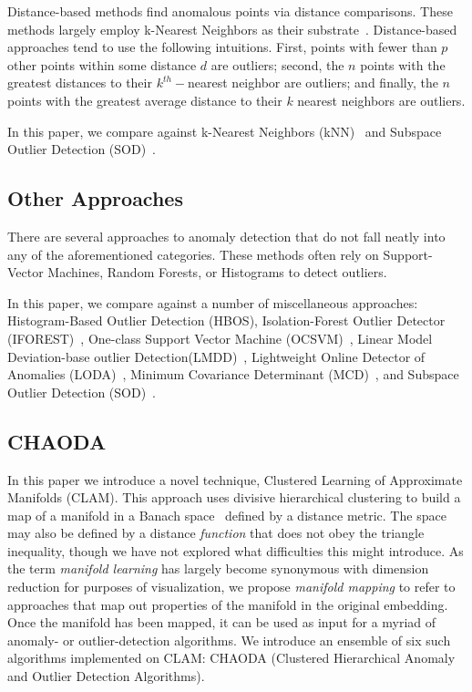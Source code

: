 Distance-based methods find anomalous points via distance comparisons.
These methods largely employ k-Nearest Neighbors as their substrate~\cite{wang2019progress}.
Distance-based approaches tend to use the following intuitions. First, points with fewer than $p$ other points within some distance $d$ are outliers; second, the $n$ points with the greatest distances to their $k^{th}-$nearest neighbor are outliers;
and finally, the $n$ points with the greatest average distance to their $k$ nearest neighbors are outliers.

In this paper, we compare against
k-Nearest Neighbors (kNN)~\cite{ramaswamy2000efficient, sridhar2000knn, fabrizio2002knn}
and Subspace Outlier Detection (SOD)~\cite{kriegel2009sod}.


\subsection{Other Approaches}
\label{subsec:introduction:other-appraoches}

There are several approaches to anomaly detection that do not fall neatly into any of the aforementioned categories.
These methods often rely on Support-Vector Machines, Random Forests, or Histograms to detect outliers.

In this paper, we compare against a number of miscellaneous approaches:
Histogram-Based Outlier Detection (HBOS)\cite{goldstein2012histogram},
Isolation-Forest Outlier Detector (IFOREST)~\cite{tony2008iforest,tony2012iforest},
One-class Support Vector Machine (OCSVM)~\cite{sholkopf2001ocsvm},
Linear Model Deviation-base outlier Detection(LMDD)~\cite{arning1996linear},
Lightweight Online Detector of Anomalies (LODA)~\cite{pevny2016loda},
Minimum Covariance Determinant (MCD)~\cite{rousseeuw1999mcd,hardin2004mcd},
and Subspace Outlier Detection (SOD)~\cite{kriegel2009sod}.


\subsection{CHAODA}
\label{subsec:introduction:chaoda}

In this paper we introduce a novel technique, Clustered Learning of Approximate Manifolds (CLAM).
This approach uses divisive hierarchical clustering to build a map of a manifold in a Banach space~\cite{banach1929fonctionnelles} defined by a distance metric.
The space may also be defined by a distance \textit{function} that does not obey the triangle inequality, though we have not explored what difficulties this might introduce.
As the term \emph{manifold learning} has largely become synonymous with dimension reduction for purposes of visualization, we propose \emph{manifold mapping} to refer to approaches that map out properties of the manifold in the original embedding.
Once the manifold has been mapped, it can be used as input for a myriad of anomaly- or outlier-detection algorithms.
We introduce an ensemble of six such algorithms implemented on CLAM: CHAODA (Clustered Hierarchical Anomaly and Outlier Detection Algorithms).

